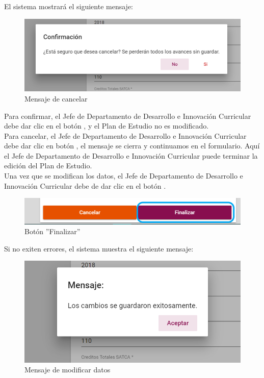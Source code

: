 El sistema mostrará el siguiente mensaje:
\begin{figure}[H]
	\centering
	\hypertarget{ms1}{\includegraphics[width=0.7\linewidth]{images/SP4-GPE/m1}}
	\caption{Mensaje de cancelar}
	\label{ms1}
\end{figure}

Para confirmar, el Jefe de Departamento de Desarrollo e Innovación Curricular debe dar clic en el botón  , y el Plan de Estudio no es modificado.\\

Para cancelar, el Jefe de Departamento de Desarrollo e Innovación Curricular debe dar clic en botón  , el mensaje se cierra y continuamos en el formulario. Aquí el Jefe de Departamento de Desarrollo e Innovación Curricular puede terminar la edición del Plan de Estudio.\\

Una vez que se modifican los datos,  el Jefe de Departamento de Desarrollo e Innovación Curricular debe de dar clic en el botón  .
\begin{figure}[H]
	\centering
	\hypertarget{btnfin}{\includegraphics[width=0.7\linewidth]{images/SP4-GPE/editarPER}}
	\caption{Botón ''Finalizar''}
	\label{btnfin}
\end{figure}

Si no exiten errores, el sistema muestra el siguiente mensaje:
\begin{figure}[H]
	\centering
	\hypertarget{ms2}{\includegraphics[width=0.7\linewidth]{images/SP4-GPE/m2}}
	\caption{Mensaje de modificar datos}
	\label{ms2}
\end{figure}


